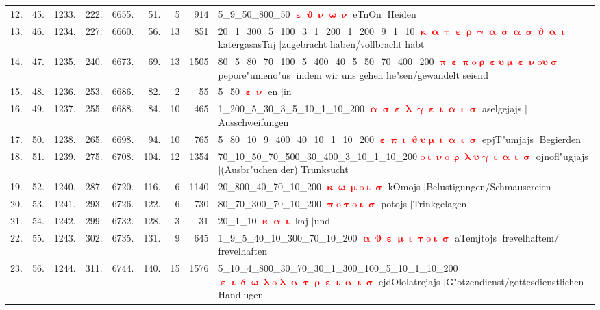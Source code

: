 \documentclass[a4paper,10pt,landscape]{article}
\begin{document}
\begin{tabular}{rrrrrrrrp{120mm}}
12.&45.&1233.&222.&6655.&51.&5&914&5\_9\_50\_800\_50 \textcolor{red}{$\boldsymbol{\upepsilon\upvartheta\upnu\upomega\upnu}$} eTnOn $|$Heiden\\
13.&46.&1234.&227.&6660.&56.&13&851&20\_1\_300\_5\_100\_3\_1\_200\_1\_200\_9\_1\_10 \textcolor{red}{$\boldsymbol{\upkappa\upalpha\uptau\upepsilon\uprho\upgamma\upalpha\upsigma\upalpha\upsigma\upvartheta\upalpha\upiota}$} katergasasTaj $|$zugebracht haben/vollbracht habt\\
14.&47.&1235.&240.&6673.&69.&13&1505&80\_5\_80\_70\_100\_5\_400\_40\_5\_50\_70\_400\_200 \textcolor{red}{$\boldsymbol{\uppi\upepsilon\uppi\mathrm{o}\uprho\upepsilon\upsilon\upmu\upepsilon\upnu\mathrm{o}\upsilon\upsigma}$} pepore"umeno"us $|$indem wir uns gehen lie"sen/gewandelt seiend\\
15.&48.&1236.&253.&6686.&82.&2&55&5\_50 \textcolor{red}{$\boldsymbol{\upepsilon\upnu}$} en $|$in\\
16.&49.&1237.&255.&6688.&84.&10&465&1\_200\_5\_30\_3\_5\_10\_1\_10\_200 \textcolor{red}{$\boldsymbol{\upalpha\upsigma\upepsilon\uplambda\upgamma\upepsilon\upiota\upalpha\upiota\upsigma}$} aselgejajs $|$Ausschweifungen\\
17.&50.&1238.&265.&6698.&94.&10&765&5\_80\_10\_9\_400\_40\_10\_1\_10\_200 \textcolor{red}{$\boldsymbol{\upepsilon\uppi\upiota\upvartheta\upsilon\upmu\upiota\upalpha\upiota\upsigma}$} epjT"umjajs $|$Begierden\\
18.&51.&1239.&275.&6708.&104.&12&1354&70\_10\_50\_70\_500\_30\_400\_3\_10\_1\_10\_200 \textcolor{red}{$\boldsymbol{\mathrm{o}\upiota\upnu\mathrm{o}\upvarphi\uplambda\upsilon\upgamma\upiota\upalpha\upiota\upsigma}$} ojnofl"ugjajs $|$(Ausbr"uchen der) Trunksucht\\
19.&52.&1240.&287.&6720.&116.&6&1140&20\_800\_40\_70\_10\_200 \textcolor{red}{$\boldsymbol{\upkappa\upomega\upmu\mathrm{o}\upiota\upsigma}$} kOmojs $|$Belustigungen/Schmausereien\\
20.&53.&1241.&293.&6726.&122.&6&730&80\_70\_300\_70\_10\_200 \textcolor{red}{$\boldsymbol{\uppi\mathrm{o}\uptau\mathrm{o}\upiota\upsigma}$} potojs $|$Trinkgelagen\\
21.&54.&1242.&299.&6732.&128.&3&31&20\_1\_10 \textcolor{red}{$\boldsymbol{\upkappa\upalpha\upiota}$} kaj $|$und\\
22.&55.&1243.&302.&6735.&131.&9&645&1\_9\_5\_40\_10\_300\_70\_10\_200 \textcolor{red}{$\boldsymbol{\upalpha\upvartheta\upepsilon\upmu\upiota\uptau\mathrm{o}\upiota\upsigma}$} aTemjtojs $|$frevelhaftem/ frevelhaften\\
23.&56.&1244.&311.&6744.&140.&15&1576&5\_10\_4\_800\_30\_70\_30\_1\_300\_100\_5\_10\_1\_10\_200 \textcolor{red}{$\boldsymbol{\upepsilon\upiota\updelta\upomega\uplambda\mathrm{o}\uplambda\upalpha\uptau\uprho\upepsilon\upiota\upalpha\upiota\upsigma}$} ejdOlolatrejajs $|$G"otzendienst/gottesdienstlichen Handlugen\\
\end{tabular}\medskip \\
\end{document}
